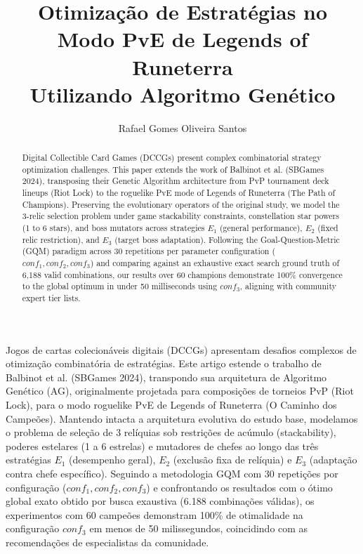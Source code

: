 \documentclass[12pt]{article}
\title{Otimização de Estratégias no Modo PvE de Legends of Runeterra\\ Utilizando Algoritmo Genético}
\author{Rafael Gomes Oliveira Santos\inst{1}}
\begin{document}
\maketitle

\begin{abstract}
Digital Collectible Card Games (DCCGs) present complex combinatorial strategy optimization challenges. This paper extends the work of Balbinot et al. (SBGames 2024), transposing their Genetic Algorithm architecture from PvP tournament deck lineups (Riot Lock) to the roguelike PvE mode of Legends of Runeterra (The Path of Champions). Preserving the evolutionary operators of the original study, we model the 3-relic selection problem under game stackability constraints, constellation star powers (1 to 6 stars), and boss mutators across strategies $E_1$ (general performance), $E_2$ (fixed relic restriction), and $E_3$ (target boss adaptation). Following the Goal-Question-Metric (GQM) paradigm across 30 repetitions per parameter configuration ($conf_1, conf_2, conf_3$) and comparing against an exhaustive exact search ground truth of 6,188 valid combinations, our results over 60 champions demonstrate 100\% convergence to the global optimum in under 50 milliseconds using $conf_3$, aligning with community expert tier lists.
\end{abstract}

\begin{resumo}
Jogos de cartas colecionáveis digitais (DCCGs) apresentam desafios complexos de otimização combinatória de estratégias. Este artigo estende o trabalho de Balbinot et al. (SBGames 2024), transpondo sua arquitetura de Algoritmo Genético (AG), originalmente projetada para composições de torneios PvP (Riot Lock), para o modo roguelike PvE de Legends of Runeterra (O Caminho dos Campeões). Mantendo intacta a arquitetura evolutiva do estudo base, modelamos o problema de seleção de 3 relíquias sob restrições de acúmulo (stackability), poderes estelares (1 a 6 estrelas) e mutadores de chefes ao longo das três estratégias $E_1$ (desempenho geral), $E_2$ (exclusão fixa de relíquia) e $E_3$ (adaptação contra chefe específico). Seguindo a metodologia GQM com 30 repetições por configuração ($conf_1, conf_2, conf_3$) e confrontando os resultados com o ótimo global exato obtido por busca exaustiva (6.188 combinações válidas), os experimentos com 60 campeões demonstram 100\% de otimalidade na configuração $conf_3$ em menos de 50 milissegundos, coincidindo com as recomendações de especialistas da comunidade.
\end{resumo}
\end{document}
